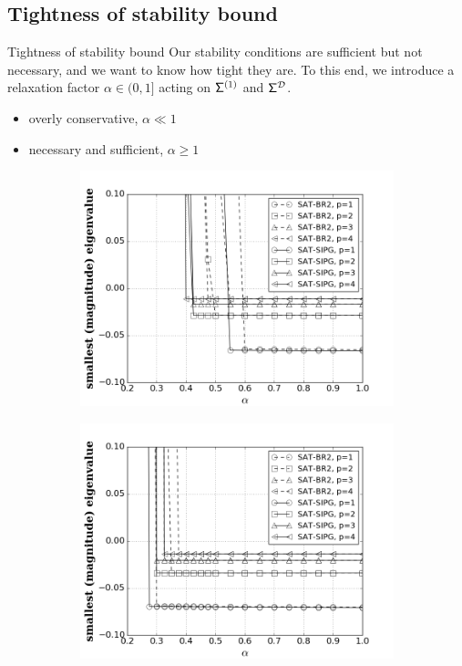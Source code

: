 \documentclass{beamer}
\begin{document}
\subsection{Tightness of stability bound}
\begin{frame}{Tightness of stability bound}
    Our stability conditions are sufficient but not necessary, and we want to know how tight they are. To this end, we introduce a relaxation factor 
    $\alpha \in (0,1]$ acting on $\mathsf{\Sigma}^{(1)}$ and $\mathsf{\Sigma}^{\mathcal{D}}$.
    \begin{itemize}
        \item overly conservative, $\alpha \ll 1$
        \item necessary and sufficient, $\alpha \ge 1$ 
    \end{itemize}
    \begin{figure} 
        \begin{subfigure}{0.45\textwidth}
            \centering
            \includegraphics[width=1.0\linewidth]{figures/relaxation_eigMin_gamma.png}
        \end{subfigure}
        \begin{subfigure}{0.45\textwidth}
            \centering
            \includegraphics[width=1.0\linewidth]{figures/relaxation_eigMin_omega.png}

\end{subfigure}
\end{figure}
\end{frame}
\end{document}
